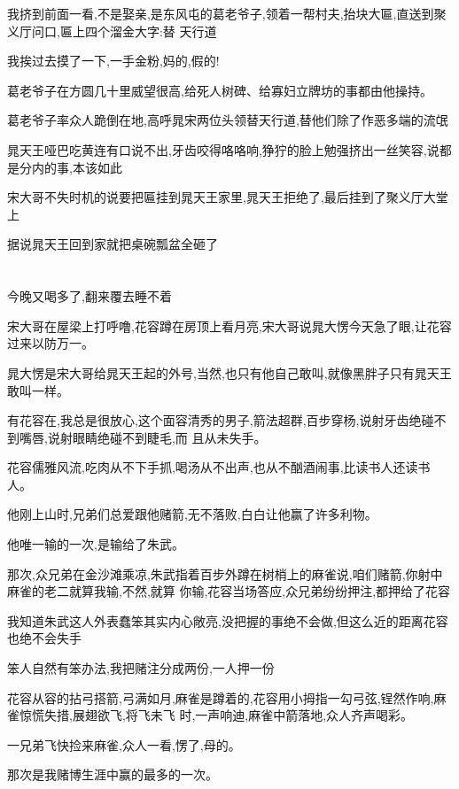 ﻿\documentclass[12pt]{article}
\begin{document}
我挤到前面一看,不是娶亲,是东风屯的葛老爷子,领着一帮村夫,抬块大匾,直送到聚义厅问口,匾上四个溜金大字:替
天行道

我挨过去摸了一下,一手金粉,妈的,假的!

葛老爷子在方圆几十里威望很高,给死人树碑、给寡妇立牌坊的事都由他操持。

葛老爷子率众人跪倒在地,高呼晁宋两位头领替天行道,替他们除了作恶多端的流氓\dldots

晁天王哑巴吃黄连有口说不出,牙齿咬得咯咯响,狰狞的脸上勉强挤出一丝笑容,说都是分内的事,本该如此

宋大哥不失时机的说要把匾挂到晁天王家里,晁天王拒绝了,最后挂到了聚义厅大堂上

据说晁天王回到家就把桌碗瓢盆全砸了

\section{}

今晚又喝多了,翻来覆去睡不着

宋大哥在屋梁上打呼噜,花容蹲在房顶上看月亮,宋大哥说晁大愣今天急了眼,让花容过来以防万一。

晁大愣是宋大哥给晁天王起的外号,当然,也只有他自己敢叫,就像黑胖子只有晁天王敢叫一样。

有花容在,我总是很放心,这个面容清秀的男子,箭法超群,百步穿杨,说射牙齿绝碰不到嘴唇,说射眼睛绝碰不到睫毛,而
且从未失手。

花容儒雅风流,吃肉从不下手抓,喝汤从不出声,也从不酗酒闹事,比读书人还读书人。

他刚上山时,兄弟们总爱跟他赌箭,无不落败,白白让他赢了许多利物。

他唯一输的一次,是输给了朱武。

那次,众兄弟在金沙滩乘凉,朱武指着百步外蹲在树梢上的麻雀说,咱们赌箭,你射中麻雀的老二就算我输,不然,就算
你输,花容当场答应,众兄弟纷纷押注,都押给了花容

我知道朱武这人外表蠢笨其实内心敞亮,没把握的事绝不会做,但这么近的距离花容也绝不会失手

笨人自然有笨办法,我把赌注分成两份,一人押一份

花容从容的拈弓搭箭,弓满如月,麻雀是蹲着的,花容用小拇指一勾弓弦,锃然作响,麻雀惊慌失措,展翅欲飞,将飞未飞
时,一声响迪,麻雀中箭落地,众人齐声喝彩。

一兄弟飞快捡来麻雀,众人一看,愣了,母的。

那次是我赌博生涯中赢的最多的一次。
\section{}
\end{document}
